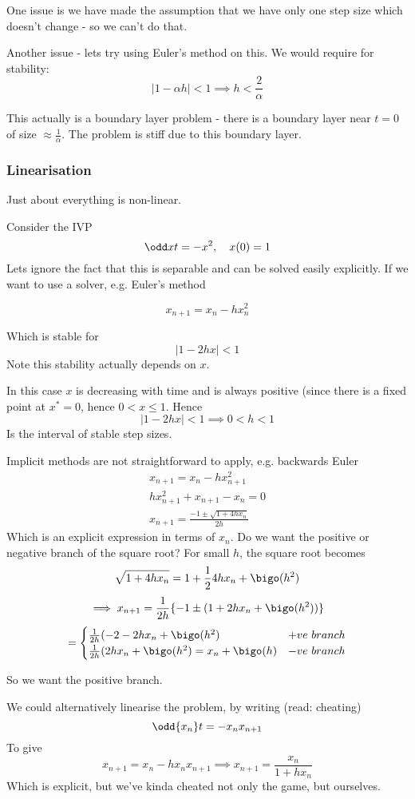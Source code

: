 \documentclass{X:/Documents/Coding/Latex/myassignment}
\begin{document}
One issue is we have made the assumption that we have only one step size which doesn't change - so we can't do that.

Another issue - lets try using Euler's method on this. We would require for stability:
\[|1-\alpha h| < 1 \implies h < \frac{2}{\alpha}\]

This actually is a boundary layer problem - there is a boundary layer near $t=0$ of size $\approx \frac1 \alpha$. The problem is stiff due to this boundary layer.

\subsubsection{Linearisation}
Just about everything is non-linear. 

Consider the IVP
\[\odd xt = -x^2,\quad x(0)=1\]
Lets ignore the fact that this is separable and can be solved easily explicitly. If we want to use a solver, e.g. Euler's method

\[x_{n+1} = x_n - h x_n^2\]

Which is stable for
\[|1-2hx| <1\]
Note this stability actually depends on $x$.

In this case $x$ is decreasing with time and is always positive (since there is a fixed point at $x^*=0$, hence $0 < x \leq 1$.
Hence
\[|1-2hx| < 1 \implies 0<h<1\]
Is the interval of stable step sizes.


Implicit methods are not straightforward to apply, e.g. backwards Euler
\begin{align*}
    x_{n+1} = x_n - hx_{n+1}^2\\
    hx_{n+1}^2 + x_{n+1} - x_n = 0\\
    x_{n+1} = \frac{-1 \pm \sqrt{1 + 4hx_n}}{2h}
\end{align*}
Which is an explicit expression in terms of $x_n$. Do we want the positive or negative branch of the square root? 
For small $h$, the square root becomes
\[\sqrt{1+4hx_n} = 1 + \frac12 4 h x_n + \bigo(h^2)\]
\[\implies x_{n+1} = \frac1{2h} \{-1\pm (1+2hx_n + \bigo(h^2))\}\]
\[=\begin{cases}
    \frac1{2h}(-2-2hx_n + \bigo(h^2) & +ve\ branch\\
    \frac1{2h}(2hx_n + \bigo(h^2) = x_n + \bigo(h) & -ve\ branch\\
\end{cases}\]

So we want the positive branch.

We could alternatively linearise the problem, by writing (read: cheating)
\[\odd{x_n}t = -x_nx_{n+1}\]
To give
\[x_{n+1} = x_n -hx_nx_{n+1} \implies x_{n+1} = \frac{x_n}{1+hx_n}\]
Which is explicit, but we've kinda cheated not only the game, but ourselves.
\end{document}
